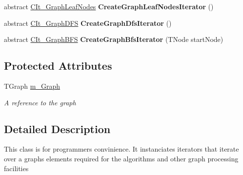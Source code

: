 \begin{DoxyCompactItemize}
\item 
\hypertarget{class_graph_library_1_1_generics_1_1_abstract_graph_iterator_factory_a31f5f1dd1751eda776dc6ef95c766321}{}abstract \hyperlink{class_graph_library_1_1_c_it___graph_leaf_nodes}{C\+It\+\_\+\+Graph\+Leaf\+Nodes} {\bfseries Create\+Graph\+Leaf\+Nodes\+Iterator} ()\label{class_graph_library_1_1_generics_1_1_abstract_graph_iterator_factory_a31f5f1dd1751eda776dc6ef95c766321}

\item 
\hypertarget{class_graph_library_1_1_generics_1_1_abstract_graph_iterator_factory_a3d1fb037c1e0dd1b5d2b101115828b13}{}abstract \hyperlink{class_graph_library_1_1_c_it___graph_d_f_s}{C\+It\+\_\+\+Graph\+D\+F\+S} {\bfseries Create\+Graph\+Dfs\+Iterator} ()\label{class_graph_library_1_1_generics_1_1_abstract_graph_iterator_factory_a3d1fb037c1e0dd1b5d2b101115828b13}

\item 
\hypertarget{class_graph_library_1_1_generics_1_1_abstract_graph_iterator_factory_a7e3269a17f343779069ae26ece350d2e}{}abstract \hyperlink{class_graph_library_1_1_c_it___graph_b_f_s}{C\+It\+\_\+\+Graph\+B\+F\+S} {\bfseries Create\+Graph\+Bfs\+Iterator} (T\+Node start\+Node)\label{class_graph_library_1_1_generics_1_1_abstract_graph_iterator_factory_a7e3269a17f343779069ae26ece350d2e}

\end{DoxyCompactItemize}
\subsection*{Protected Attributes}
\begin{DoxyCompactItemize}
\item 
T\+Graph \hyperlink{class_graph_library_1_1_generics_1_1_abstract_graph_iterator_factory_a536c2a6608e8d664bc37c0ee9b878d91}{m\+\_\+\+Graph}
\begin{DoxyCompactList}\small\item\em A reference to the graph \end{DoxyCompactList}\end{DoxyCompactItemize}


\subsection{Detailed Description}
This class is for programmers convinience. It instanciates iterators that iterate over a graph\textquotesingle{}s elements required for the algorithms and other graph processing facilities 


